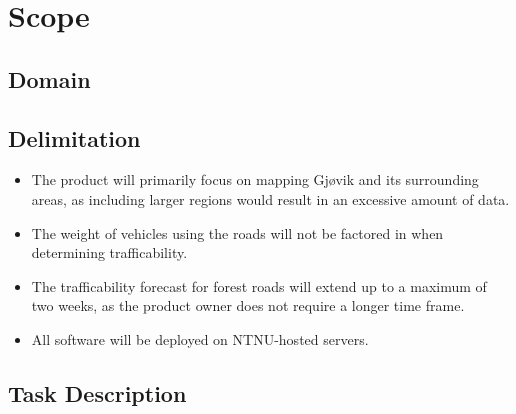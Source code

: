 \section{Scope}
\subsection{Domain}
\subsection{Delimitation}
\begin{itemize}
    \item The product will primarily focus on mapping Gjøvik and its surrounding areas, as including larger regions would result in an excessive amount of data.
    \item The weight of vehicles using the roads will not be factored in when determining trafficability.
    \item The trafficability forecast for forest roads will extend up to a maximum of two weeks, as the product owner does not require a longer time frame.
    \item All software will be deployed on NTNU-hosted servers.
\end{itemize}

\subsection{Task Description}